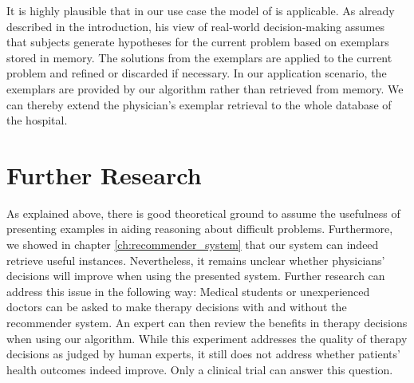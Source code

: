 It is highly plausible that in our use case the model of \citet{Klein2008} is applicable. As already described in the introduction, his view of real-world decision-making assumes that subjects generate hypotheses for the current problem based on exemplars stored in memory. The solutions from the exemplars are applied to the current problem and refined or discarded if necessary. In our application scenario, the exemplars are provided by our algorithm rather than retrieved from memory. We can thereby extend the physician's exemplar retrieval to the whole database of the hospital.

\section{Further Research}
As explained above, there is good theoretical ground to assume the usefulness of presenting examples in aiding reasoning about difficult problems. Furthermore, we showed in chapter \ref{ch:recommender_system} that our system can indeed retrieve useful instances. Nevertheless, it remains unclear whether physicians' decisions will improve when using the presented system. Further research can address this issue in the following way: Medical students or unexperienced doctors can be asked to make therapy decisions with and without the recommender system. An expert can then review the benefits in therapy decisions when using our algorithm. While this experiment addresses the quality of therapy decisions as judged by human experts, it still does not address whether patients' health outcomes indeed improve. Only a clinical trial can answer this question.

